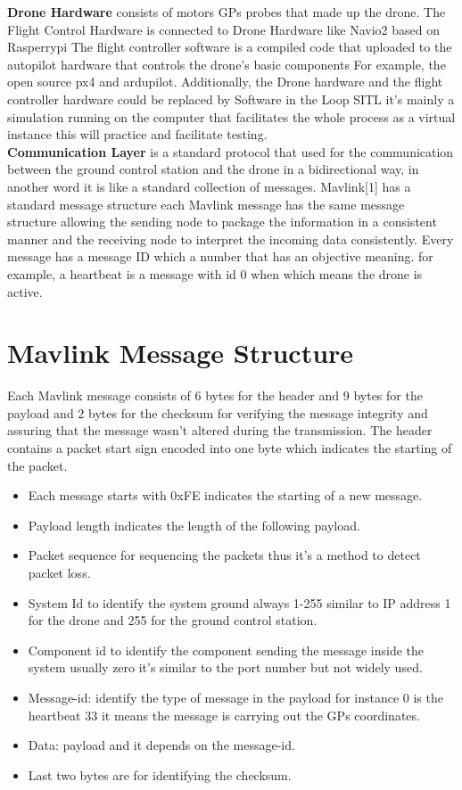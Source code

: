 \textbf{Drone Hardware} consists of motors GPs probes that made up the drone.
The Flight Control Hardware is connected to Drone Hardware like Navio2 based on Rasperrypi
The flight controller software is a compiled code that uploaded to the autopilot hardware that controls the drone's basic components For example, the open source px4 and ardupilot. Additionally, the Drone hardware and the flight controller hardware could be replaced by Software in the Loop SITL it's mainly a simulation running on the computer that facilitates the whole process as a virtual instance this will practice and facilitate testing. \\ 

\textbf{Communication Layer} is a standard protocol that used for the communication between the ground control station and the drone in a bidirectional way, in another word it is like a standard collection of messages. Mavlink[1] has a standard message structure each Mavlink message has the same message structure allowing the sending node to package the information in a consistent manner and the receiving node to interpret the incoming data consistently. Every message has a message ID which a number that has an objective meaning. for example, a heartbeat is a message with id 0 when which means the drone is active.



\section{Mavlink Message Structure}


Each Mavlink message consists of 6 bytes for the header and 9 bytes for the payload and 2 bytes for the checksum for verifying the message integrity and assuring that the message wasn’t altered during the transmission. The header contains a packet start sign encoded into one byte which indicates the starting of the packet.
\begin{itemize}
  \item Each message starts with 0xFE indicates the starting of a new message.
  \item Payload length indicates the length of the following payload.
  \item Packet sequence for sequencing the packets thus it’s a method to detect packet loss.
\item System Id to identify the system ground always 1-255 similar to IP address 1 for the drone and 255 for the ground control station.
\item Component id to identify the component sending the message inside the system usually zero it’s similar to the port number but not widely used.
\item Message-id: identify the type of message in the payload for instance 0 is the heartbeat 33 it means the message is carrying out the GPs coordinates.
\item Data: payload and it depends on the message-id.
\item Last two bytes are for identifying the checksum.
\end{itemize}

